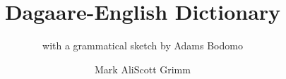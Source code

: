 \title{Dagaare-English Dictionary}
\subtitle{with a grammatical sketch by Adams Bodomo}
\author{Mark Ali\lastand Scott Grimm}%

\renewcommand{\lsISBNdigital}{000-0-000000-00-0}
\renewcommand{\lsISBNsoftcover}{000-0-000000-00-0}
\renewcommand{\lsISBNsoftcoverus}{000-0-000000-00-0}
\renewcommand{\lsSeries}{algad} %
\renewcommand{\lsSeriesNumber}{99} %
\renewcommand{\lsID}{000} %
